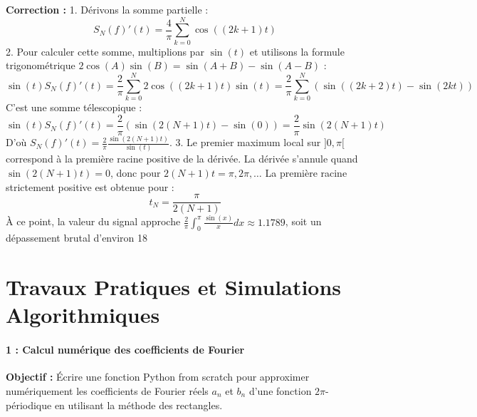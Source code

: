 \documentclass[12pt,a4paper]{article}
\begin{document}
\textbf{Correction :}
1. Dérivons la somme partielle :
   $$S_N(f)'(t) = \frac{4}{\pi} \sum_{k=0}^N \cos((2k+1)t)$$
2. Pour calculer cette somme, multiplions par $\sin(t)$ et utilisons la formule trigonométrique $2 \cos(A) \sin(B) = \sin(A+B) - \sin(A-B)$ :
   $$\sin(t) S_N(f)'(t) = \frac{2}{\pi} \sum_{k=0}^N 2 \cos((2k+1)t) \sin(t) = \frac{2}{\pi} \sum_{k=0}^N \left( \sin((2k+2)t) - \sin(2kt) \right)$$
   C'est une somme télescopique :
   $$\sin(t) S_N(f)'(t) = \frac{2}{\pi} \left( \sin(2(N+1)t) - \sin(0) \right) = \frac{2}{\pi} \sin(2(N+1)t)$$
   D'où $S_N(f)'(t) = \frac{2}{\pi} \frac{\sin(2(N+1)t)}{\sin(t)}$.
3. Le premier maximum local sur $]0, \pi[$ correspond à la première racine positive de la dérivée.
   La dérivée s'annule quand $\sin(2(N+1)t) = 0$, donc pour $2(N+1)t = \pi, 2\pi, \dots$
   La première racine strictement positive est obtenue pour :
   $$t_N = \frac{\pi}{2(N+1)}$$
   À ce point, la valeur du signal approche $\frac{2}{\pi} \int_0^\pi \frac{\sin(x)}{x} dx \approx 1.1789$, soit un dépassement brutal d'environ 18%



\part{Travaux Pratiques et Simulations Algorithmiques}
\subsection*{1 : Calcul numérique des coefficients de Fourier}

\textbf{Objectif :} Écrire une fonction Python from scratch pour approximer numériquement les coefficients de Fourier réels $a_n$ et $b_n$ d'une fonction $2\pi$-périodique en utilisant la méthode des rectangles.
\end{document}
